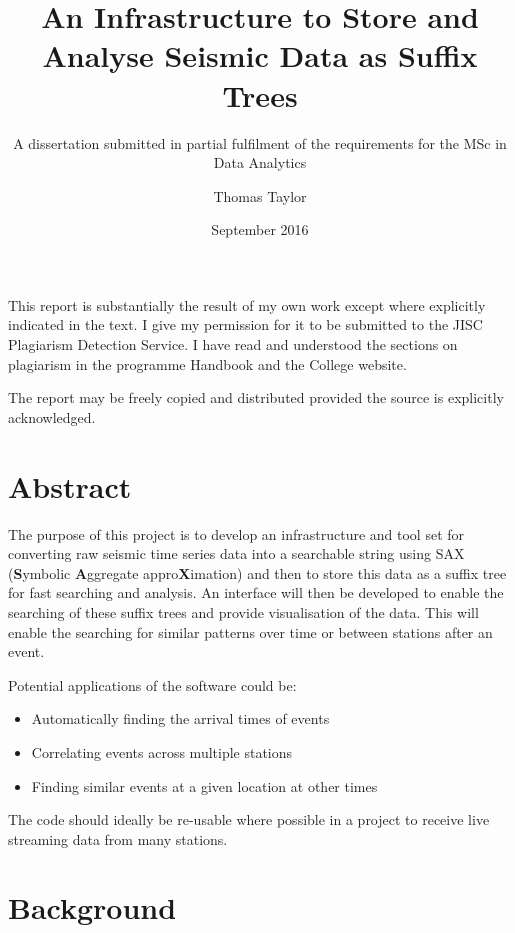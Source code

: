 \documentclass[11pt, a4paper]{scrartcl}
\title{An Infrastructure to Store and Analyse Seismic Data as Suffix Trees}
\subtitle{A dissertation submitted in partial fulfilment of the requirements for the MSc in Data Analytics}
\author{Thomas Taylor}
\affil{Department of Computer Science and Information Systems, Birkbeck College, University of London}
\date{September 2016}
\begin{document}
	\maketitle
	\begin{itshape}
		This report is substantially the result of my own work except where explicitly indicated in the text. I give my permission for it to be submitted to the JISC Plagiarism Detection Service. I have read and understood the sections on plagiarism in the programme Handbook and the College website.
		
		The report may be freely copied and distributed provided the source is explicitly acknowledged.
	\end{itshape}
	\newpage
	
	\section*{Abstract}
	The purpose of this project is to develop an infrastructure and tool set for converting raw seismic time series data into a searchable string using SAX (\textbf{S}ymbolic \textbf{A}ggregate appro\textbf{X}imation) and then to store this data as a suffix tree for fast searching and analysis.  An interface will then be developed to enable the searching of these suffix trees and provide visualisation of the data.  This will enable the searching for similar patterns over time or between stations after an event.
	
	Potential applications of the software could be:
	\begin{itemize}
		\item Automatically finding the arrival times of events
		\item Correlating events across multiple stations
		\item Finding similar events at a given location at other times
	\end{itemize}
	
	The code should ideally be re-usable where possible in a project to receive live streaming data from many stations.
	\newpage
	\tableofcontents
	\thispagestyle{empty}
	\cleardoubleemptypage
		
	\section{Background}
\end{document}
